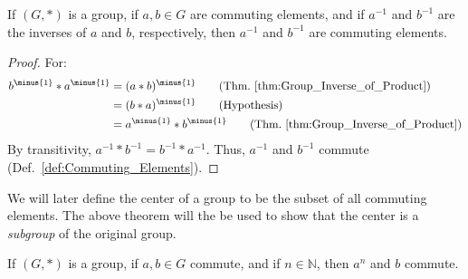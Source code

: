     \begin{theorem}
        \label{thm:Group_Commuting_Elements_Have_Commuting_Inverses}%
        If $(G,*)$ is a group, if $a,b\in{G}$ are commuting elements, and if
        $a^{\minus{1}}$ and $b^{\minus{1}}$ are the inverses of $a$ and $b$,
        respectively, then $a^{\minus{1}}$ and $b^{\minus{1}}$ are commuting
        elements.
    \end{theorem}
    \begin{proof}
        For:
        \begin{align}
            b^{\minus{1}}*a^{\minus{1}}
            &=(a*b)^{\minus{1}}
            \tag{Thm.~\ref{thm:Group_Inverse_of_Product}}\\
            &=(b*a)^{\minus{1}}
            \tag{Hypothesis}\\
            &=a^{\minus{1}}*b^{\minus{1}}
            \tag{Thm.~\ref{thm:Group_Inverse_of_Product}}
        \end{align}
        By transitivity,
        $a^{\minus{1}}*b^{\minus{1}}=b^{\minus{1}}*a^{\minus{1}}$. Thus,
        $a^{\minus{1}}$ and $b^{\minus{1}}$ commute
        (Def.~\ref{def:Commuting_Elements}).
    \end{proof}
    We will later define the center of a group to be the subset of all commuting
    elements. The above theorem will the be used to show that the center is a
    \textit{subgroup} of the original group.
    \begin{theorem}
        \label{thm:Group_Comm_Elems_Have_Comm_Powers_a}%
        If $(G,*)$ is a group, if $a,b\in{G}$ commute, and if $n\in\mathbb{N}$,
        then $a^{n}$ and $b$ commute.
    \end{theorem}
